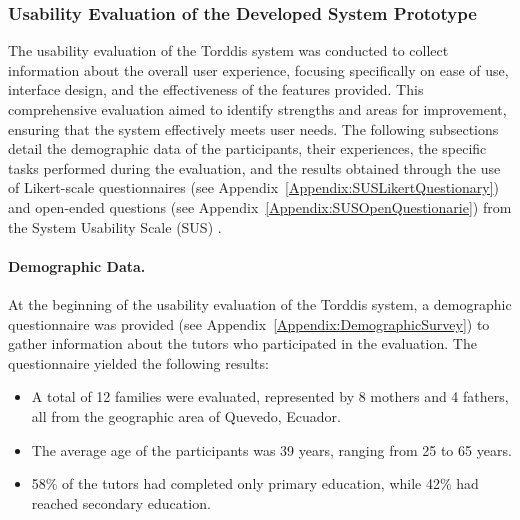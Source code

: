                 \subsubsection{Usability Evaluation of the Developed System Prototype}
                The usability evaluation of the Torddis system was conducted to collect information about the overall user experience, focusing specifically on ease of use, interface design, and the effectiveness of the features provided. This comprehensive evaluation aimed to identify strengths and areas for improvement, ensuring that the system effectively meets user needs. The following subsections detail the demographic data of the participants, their experiences, the specific tasks performed during the evaluation, and the results obtained through the use of Likert-scale questionnaires (see Appendix~\ref{Appendix:SUSLikertQuestionary}) and open-ended questions (see Appendix~\ref{Appendix:SUSOpenQuestionarie}) from the System Usability Scale (SUS) \citep{Brooke1996SUS}.
                
                \paragraph{Demographic Data.}
                At the beginning of the usability evaluation of the Torddis system, a demographic questionnaire was provided (see Appendix~\ref{Appendix:DemographicSurvey}) to gather information about the tutors who participated in the evaluation. The questionnaire yielded the following results:
                
                \begin{itemize} 
                    \item A total of 12 families were evaluated, represented by 8 mothers and 4 fathers, all from the geographic area of Quevedo, Ecuador.
                    \item The average age of the participants was 39 years, ranging from 25 to 65 years.
                    \item 58\% of the tutors had completed only primary education, while 42\% had reached secondary education.
                \end{itemize}
                
